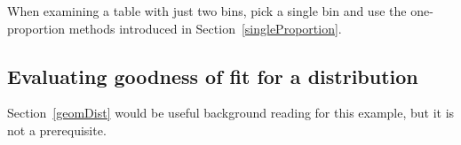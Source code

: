 When examining a table with just two bins,
pick a single bin and use the one-proportion methods
introduced in Section~\ref{singleProportion}.


\D{\newpage}

\subsection{Evaluating goodness of fit for a distribution}

Section~\ref{geomDist} would be useful background reading
for this example, but it is not a prerequisite.


\newcommand{\spyears}{10}
\newcommand{\spdays}{1362}
\newcommand{\spdaysA}{717}
\newcommand{\spdaysB}{369}
\newcommand{\spdaysC}{155}
\newcommand{\spdaysD}{69}
\newcommand{\spdaysE}{28}
\newcommand{\spdaysF}{14}
\newcommand{\spdaysG}{10}
\newcommand{\spdaysEA}{743}
\newcommand{\spdaysEB}{338}
\newcommand{\spdaysEC}{154}
\newcommand{\spdaysED}{70}
\newcommand{\spdaysEE}{32}
\newcommand{\spdaysEF}{14}
\newcommand{\spdaysEG}{12}
\newcommand{\spdaysEProp}{0.1128}
\newcommand{\spdaysEPerc}{11.28\%}
\newcommand{\spUpProp}{0.545}
\newcommand{\spUpPerc}{54.5\%}
\newcommand{\spDownProp}{0.455}
\newcommand{\spDownPerc}{45.5\%}
\newcommand{\spdaysXSq}{4.61}
\newcommand{\spdaysN}{7}
\newcommand{\spdaysDF}{6}
\newcommand{\spdaysPvalue}{0.5951}

